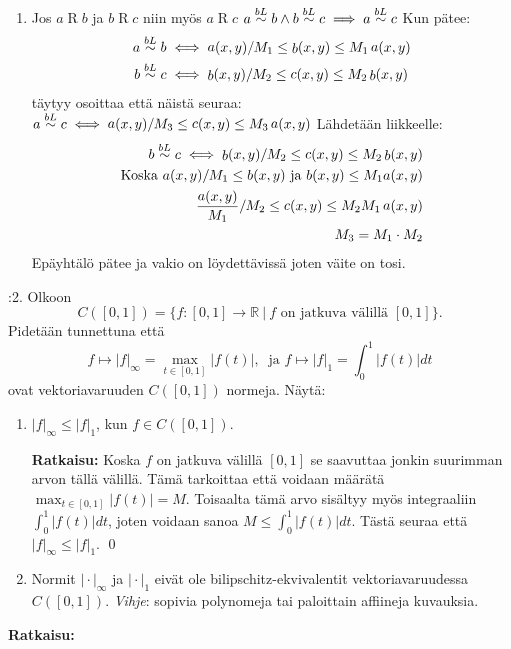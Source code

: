 \documentclass[12pt,a4paper,leqno]{amsart}
\begin{document}
\begin{enumerate}
    \item Jos $a\mathop{R}b$ ja $b\mathop{R}c$ niin myös $a\mathop{R}c$
$a \buildrel{bL}\over\sim b \land b \buildrel{bL}\over\sim c \implies a \buildrel{bL}\over\sim c$
Kun pätee: 
\begin{align*}
a \buildrel{bL}\over\sim b & \iff \mathop{a}(x, y)/M_1 \leq \mathop{b}(x, y) \leq M_1 \mathop{a}(x, y) \\
b \buildrel{bL}\over\sim c & \iff \mathop{b}(x, y)/M_2 \leq \mathop{c}(x, y) \leq M_2 \mathop{b}(x, y) \\
\end{align*}
täytyy osoittaa että näistä seuraa:
$a \buildrel{bL}\over\sim c  \iff \mathop{a}(x, y)/M_3 \leq \mathop{c}(x, y) \leq M_3 \mathop{a}(x, y)$
Lähdetään liikkeelle:
\begin{align*}
b \buildrel{bL}\over\sim c \iff \mathop{b}(x, y)/M_2 \leq \mathop{c}(x, y) \leq M_2 \mathop{b}(x, y) \\
\text{Koska } a(x, y) /M_1 \leq b(x, y) \text{ ja } b(x, y) \leq M_1 a(x, y) \\
\frac{\mathop{a}(x, y)}{M_1}/M_2 \leq \mathop{c}(x, y) \leq M_2 M_1 \mathop{a}(x, y) \\
M_3 = M_1 \cdot M_2
\end{align*}
Epäyhtälö pätee ja vakio on löydettävissä joten väite on tosi.
\end{enumerate}
\bigskip

:2. Olkoon 
\[
C([0,1]) = \{f: [0,1] \to \mathbb R \ | \  f \textrm{ on jatkuva välillä } [0,1]\}.
\]
Pidetään tunnettuna että 
\[
f \mapsto \vert f\vert_{\infty} = \max_{t \in [0,1]} \vert f(t) \vert, \   \textrm{ ja }  f \mapsto \vert f\vert_1 = \int_0^1 \vert f(t) \vert dt
\]
ovat vektoriavaruuden $C([0,1])$ normeja. Näytä: 
\begin{enumerate}
\item $\vert f\vert_{\infty} \le \vert f\vert_1$, kun $f \in C([0,1])$.

\textbf{Ratkaisu: }
Koska $f$ on jatkuva välillä $[0, 1]$ se saavuttaa jonkin suurimman arvon tällä välillä. Tämä tarkoittaa että voidaan määrätä $\max_{t \in [0,1]} \vert f(t) \vert  = M$. Toisaalta tämä arvo sisältyy myös integraaliin $\int_0^1 \vert f(t) \vert dt$, joten voidaan sanoa $M \leq \int_0^1 \vert f(t) \vert dt$. Tästä seuraa että $\vert f\vert_{\infty} \le \vert f\vert_1$. \qed
\smallskip

\item Normit $\vert \cdot \vert_{\infty}$ ja $\vert \cdot \vert_1$  eivät ole bilipschitz-ekvivalentit 
vektoriavaruudessa $C([0,1])$. \textit{Vihje}:  sopivia polynomeja  tai paloittain affiineja kuvauksia.
\end{enumerate}
\textbf{Ratkaisu:}
\end{document}
